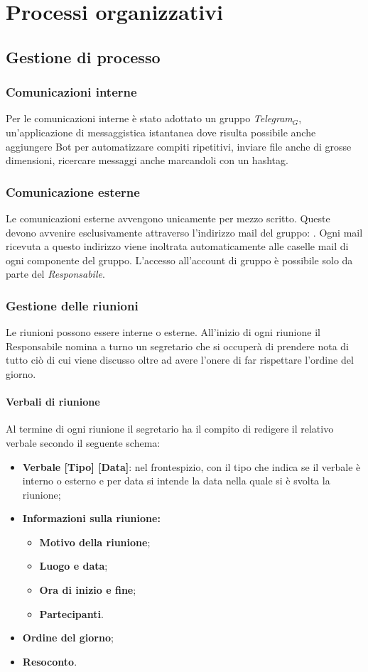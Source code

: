 \chapter{Processi organizzativi}\label{Po}
\section{Gestione di processo}
\subsection{Comunicazioni interne}
Per le comunicazioni interne è stato adottato un gruppo \textit{Telegram$_{G}$}, un'applicazione di messaggistica istantanea dove risulta possibile anche aggiungere Bot per automatizzare compiti ripetitivi, inviare file anche di grosse dimensioni, ricercare messaggi anche marcandoli con un hashtag.
\subsection{Comunicazione esterne}
Le comunicazioni esterne avvengono unicamente per mezzo scritto. 
Queste devono avvenire esclusivamente attraverso l'indirizzo mail del gruppo: \mailzeroseven.
Ogni mail ricevuta a questo indirizzo viene inoltrata automaticamente alle caselle mail di ogni componente del gruppo. L'accesso all'account di gruppo è possibile solo da parte del \textit{Responsabile}.
\subsection{Gestione delle riunioni}
Le riunioni possono essere interne o esterne. 
All'inizio di ogni riunione il Responsabile nomina a turno un segretario che si occuperà di prendere nota di tutto ciò di cui viene discusso oltre ad avere l'onere di far rispettare l'ordine del giorno.
\subsubsection{Verbali di riunione}
Al termine di ogni riunione il segretario ha il compito di redigere il relativo verbale secondo il seguente schema:
\begin{itemize}
	\item \textbf{Verbale [Tipo] [Data]}: nel frontespizio, con il tipo che indica se il verbale è interno o esterno e per data si intende la data nella quale si è svolta la riunione;
	\item \textbf{Informazioni sulla riunione:}
	\begin{itemize}
			\item \textbf{Motivo della riunione};
			\item \textbf{Luogo e data};
			\item \textbf{Ora di inizio e fine};
			\item \textbf{Partecipanti}.
	\end{itemize}
	\item \textbf{Ordine del giorno};
	\item \textbf{Resoconto}.
\end{itemize}
